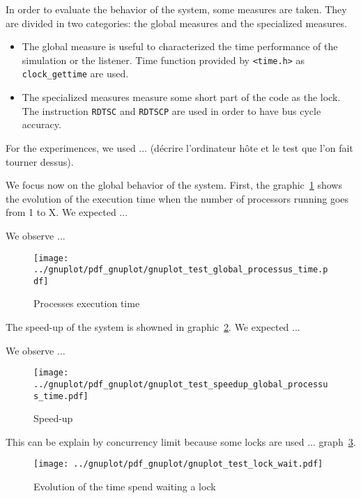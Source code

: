 In order to evaluate the behavior of the system, some measures are taken.
They are divided in two categories: the global measures and the specialized 
measures. 
\begin{itemize}
    \item The global measure is useful to characterized the time performance of 
    the simulation or the listener. Time function provided by \verb|<time.h>| as
    \verb|clock_gettime| are used.
    \item The specialized measures measure some short part of the code as the 
    lock. The instruction \verb|RDTSC| and \verb|RDTSCP| are used in order to
    have bus cycle accuracy.
\end{itemize}

For the experimences, we used ... (décrire l'ordinateur hôte et le test que l'on fait tourner dessus).

We focus now on the global behavior of the system. First, the graphic~\ref{global_proc}
shows the evolution of the execution time when the number of processors running goes from 1 to X. 
We expected ...

We observe ...


\begin{figure}[h]
\begin{center}
    \texttt{[image: ../gnuplot/pdf\_gnuplot/gnuplot\_test\_global\_processus\_time.pdf]}
	\caption{Processes execution time}
	\label{global_proc}
\end{center}
\end{figure}


The speed-up of the system is showned in graphic~\ref{speed_up_global}.
We expected ...

We observe ...


\begin{figure}[h]
\begin{center}
    \texttt{[image: ../gnuplot/pdf\_gnuplot/gnuplot\_test\_speedup\_global\_processus\_time.pdf]}
	\caption{Speed-up}
	\label{speed_up_global}
\end{center}
\end{figure}

This can be explain by concurrency limit because some locks are used ... graph~\ref{lock_wait}.


\begin{figure}[h]
\begin{center}
    \texttt{[image: ../gnuplot/pdf\_gnuplot/gnuplot\_test\_lock\_wait.pdf]}
	\caption{Evolution of the time spend waiting a lock}
	\label{lock_wait}
\end{center}
\end{figure}

